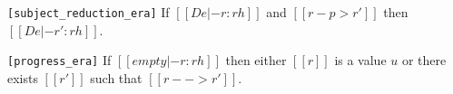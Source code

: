 \begin{lemma}
\verb|[subject_reduction_era]|
  If $[[De |- r:rh]]$ and $[[r -p> r']]$ then $[[De |- r':rh]]$.
\end{lemma}

\begin{lemma}[Progress]
\verb|[progress_era]|
  If $[[empty |- r:rh]]$ then either $[[r]]$ is a value $u$ or there
  exists $[[r']]$ such that $[[r --> r']]$.
\end{lemma}

\begin{comment}
\section{Full Specification of Surface Language}\label{sec:app:sufcc}
\subsection{Syntax}
See Figure \ref{fig:appendix:syntax}.
\begin{figure*}
\centering
\gram{\ottpgm\ottinterrule
\ottdecl\ottinterrule
\ottu\ottinterrule
\ottp\ottinterrule
\ottE\ottinterrule
\ottGs}
\begin{align*}
&\text{Syntactic Sugar} \\
&\ottsurfsugar %
\end{align*}
\caption{Syntax of the surface language}
\label{fig:appendix:syntax}
\end{figure*}

\subsection{Expression Typing}
See Figure \ref{fig:appendix:typing}.

\subsection{Translation to \ecore}
See Figure \ref{fig:appendix:translate}.

\subsection{Type Safety of the Translation}

\begin{theorem}[Type Safety of Expression Translation]
Given a surface language expression $[[E]]$ and context $[[Gs]]$, 
if $[[Gs |- E:A ~> e]]$, $[[Gs |- A:star ~> t]]$ and $[[|- Gs ~> G]]$, then
$[[G |- e:t]]$.
\end{theorem}


\end{comment}
